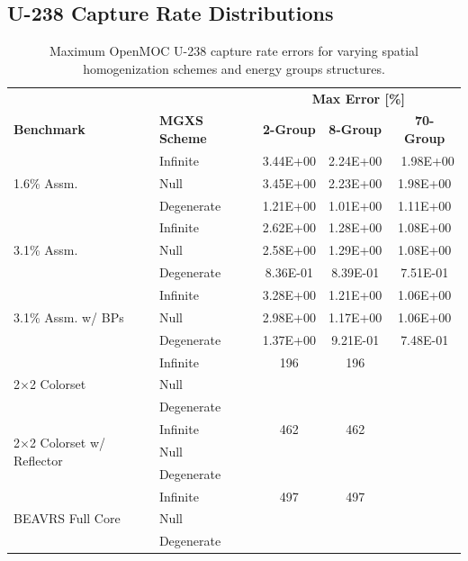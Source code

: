 \subsection{U-238 Capture Rate Distributions}
\label{subsec:chap8-capt-rates}

\begin{table}[h!]
  \centering
  \caption[Maximum OpenMOC U-238 capture rate errors]{Maximum OpenMOC U-238 capture rate errors for varying spatial homogenization schemes and energy groups structures.}
  \small
  \label{table:chap8-openmoc-max-capt-rates}
  \vspace{6pt}
  \begin{tabular}{l l c c c}
  \toprule
  \rowcolor{lightgray}
  & & \multicolumn{3}{c}{\cellcolor{lightgray} \textbf{Max Error [\%]}} \\
  \multirow{-2}{*}{\cellcolor{lightgray} \bf Benchmark} &
  \multirow{-2}{*}{\cellcolor{lightgray} \bf \ac{MGXS} Scheme} &
  {\cellcolor{lightgray} \bf 2-Group} &
  {\cellcolor{lightgray} \bf 8-Group} &
  {\cellcolor{lightgray} \bf 70-Group} \\
  \midrule
\multirow{3}{*}{\parbox{2.5cm}{1.6\% Assm.}} & Infinite & 3.44E+00 & 2.24E+00 &\
 1.98E+00 \\
& Null & 3.45E+00 & 2.23E+00 & 1.98E+00 \\
& Degenerate & 1.21E+00 & 1.01E+00 & 1.11E+00 \\
  \midrule
\multirow{3}{*}{\parbox{2.5cm}{3.1\% Assm.}} & Infinite & 2.62E+00 & 1.28E+00 & 1.08E+00 \\
& Null & 2.58E+00 & 1.29E+00 & 1.08E+00 \\
& Degenerate & 8.36E-01 & 8.39E-01 & 7.51E-01 \\
  \midrule
\multirow{3}{*}{\parbox{2.5cm}{3.1\% Assm. w/ \acp{BP}}} & Infinite & 3.28E+00 & 1.21E+00 & 1.06E+00 \\
& Null & 2.98E+00 & 1.17E+00 & 1.06E+00 \\
& Degenerate & 1.37E+00 & 9.21E-01 & 7.48E-01 \\
  \midrule
  \multirow{3}{*}{\parbox{2.5cm}{2$\times$2 Colorset}} & Infinite & 196 & 196 & \\
  & Null & & & \\
  & Degenerate & & & \\
  \midrule
  \multirow{3}{*}{\parbox{2.3cm}{2$\times$2 Colorset w/ Reflector}} & Infinite & 462 & 462 & \\
  & Null & & & \\
  & Degenerate & & & \\
  \midrule
  \multirow{3}{*}{\parbox{2cm}{\ac{BEAVRS} Full Core}} & Infinite & 497 & 497 & \\
  & Null & & & \\
  & Degenerate & & & \\
  \bottomrule
\end{tabular}
\end{table}

